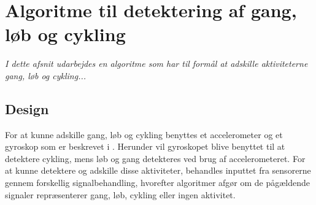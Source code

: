 \section{Algoritme til detektering af gang, løb og cykling}
\textit{I dette afsnit udarbejdes en algoritme som har til formål at adskille aktiviteterne gang, løb og cykling... }

\subsection{Design}
For at kunne adskille gang, løb og cykling benyttes et accelerometer og et gyroskop som er beskrevet i . Herunder vil gyroskopet blive benyttet til at detektere cykling, mens løb og gang detekteres ved brug af accelerometeret. For at kunne detektere og adskille disse aktiviteter, behandles inputtet fra sensorerne gennem forskellig signalbehandling, hvorefter algoritmer afgør om de pågældende signaler repræsenterer gang, løb, cykling eller ingen aktivitet. 


